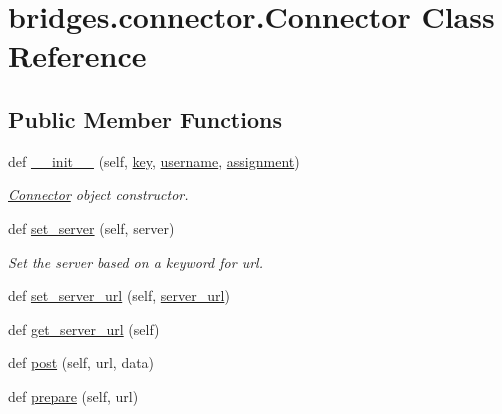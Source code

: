 \hypertarget{classbridges_1_1connector_1_1_connector}{}\section{bridges.\+connector.\+Connector Class Reference}
\label{classbridges_1_1connector_1_1_connector}
\subsection*{Public Member Functions}
\begin{DoxyCompactItemize}
\item 
def \mbox{\hyperlink{classbridges_1_1connector_1_1_connector_a2d5af7535b60c92433f2333951b7ea69}{\+\_\+\+\_\+init\+\_\+\+\_\+}} (self, \mbox{\hyperlink{classbridges_1_1connector_1_1_connector_a3b577c34402fea1910f56fd9cac51c07}{key}}, \mbox{\hyperlink{classbridges_1_1connector_1_1_connector_af2f4f996092cf63a5e7940ca93a2c6b7}{username}}, \mbox{\hyperlink{classbridges_1_1connector_1_1_connector_a2df020c062b6224d4eeb2c5407c02656}{assignment}})
\begin{DoxyCompactList}\small\item\em \mbox{\hyperlink{classbridges_1_1connector_1_1_connector}{Connector}} object constructor. \end{DoxyCompactList}\item 
def \mbox{\hyperlink{classbridges_1_1connector_1_1_connector_aabe66803d7701015138288c5ceeba81f}{set\+\_\+server}} (self, server)
\begin{DoxyCompactList}\small\item\em Set the server based on a keyword for url. \end{DoxyCompactList}\item 
def \mbox{\hyperlink{classbridges_1_1connector_1_1_connector_a6cfa754618584132754cea9a8bde5282}{set\+\_\+server\+\_\+url}} (self, \mbox{\hyperlink{classbridges_1_1connector_1_1_connector_abcc06e345e43916cf975eb200187d911}{server\+\_\+url}})
\item 
def \mbox{\hyperlink{classbridges_1_1connector_1_1_connector_a1db4c60fd9c2817c2ff237bdfb98e4a9}{get\+\_\+server\+\_\+url}} (self)
\item 
def \mbox{\hyperlink{classbridges_1_1connector_1_1_connector_abfc36138302d5ec49219cb3ccf48439a}{post}} (self, url, data)
\item 
def \mbox{\hyperlink{classbridges_1_1connector_1_1_connector_afcd39dd1f2f37a945e16254e0fed178b}{prepare}} (self, url)
\end{DoxyCompactItemize}
